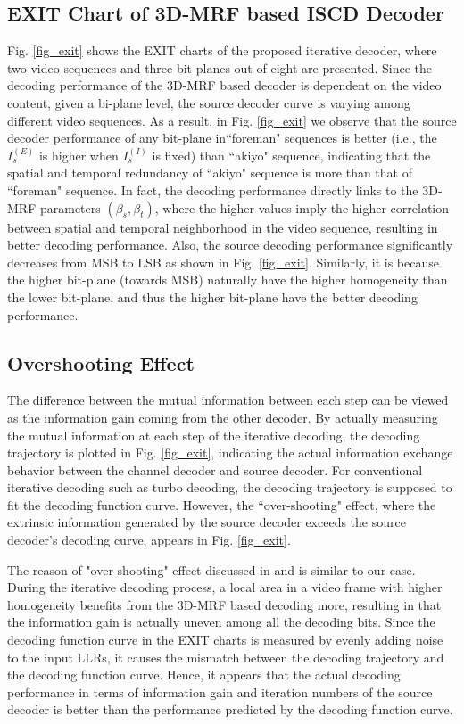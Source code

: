 \documentclass[10pt,twocolumn,twoside]{IEEEtran}
\begin{document}
\subsection{EXIT Chart of 3D-MRF based ISCD Decoder}
Fig. \ref{fig_exit} shows the EXIT charts of the proposed iterative decoder, where two video sequences and three bit-planes out of eight are presented. Since the decoding performance of the 3D-MRF based decoder is dependent on the video content, given a bi-plane level, the source decoder curve is varying among different video sequences. As a result, in Fig. \ref{fig_exit} we observe that the source decoder performance of any bit-plane in``foreman" sequences is better (i.e., the $I_s^{(E)}$ is higher when $I_s^{(I)}$ is fixed) than ``akiyo" sequence, indicating that the spatial and temporal redundancy of ``akiyo" sequence is more than that of ``foreman" sequence. In fact, the decoding performance directly links to the 3D-MRF parameters $(\beta_s, \beta_t)$, where the higher values imply the higher correlation between spatial and temporal neighborhood in the video sequence, resulting in better decoding performance. Also, the source decoding performance significantly decreases from MSB to LSB as shown in Fig. \ref{fig_exit}. Similarly, it is because the higher bit-plane (towards MSB) naturally have the higher homogeneity than the lower bit-plane, and thus the higher bit-plane have the better decoding performance.

\subsection{Overshooting Effect}
The difference between the mutual information between each step can be viewed as the information gain coming from the other decoder. By actually measuring the mutual information at each step of the iterative decoding, the decoding trajectory is plotted in Fig. \ref{fig_exit}, indicating the actual information exchange behavior between the channel decoder and source decoder. For conventional iterative decoding such as turbo decoding, the decoding trajectory is supposed to fit the decoding function curve. However, the ``over-shooting" effect, where the extrinsic information generated by the source decoder exceeds the source decoder's decoding curve, appears in Fig. \ref{fig_exit}. 

The reason of "over-shooting" effect discussed in \cite{overshooting} and \cite{overshooting2} is similar to our case. During the iterative decoding process, a local area in a video frame with higher homogeneity benefits from the 3D-MRF based decoding more, resulting in that the information gain is actually uneven among all the decoding bits. Since the decoding function curve in the EXIT charts is measured by evenly adding noise to the input LLRs, it causes the mismatch between the decoding trajectory and the decoding function curve. Hence, it appears that the actual decoding performance in terms of information gain and iteration numbers of  the source decoder is better than the performance predicted by the decoding function curve. 
\end{document}
